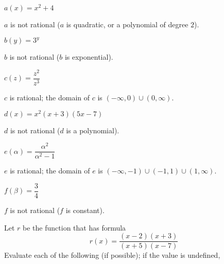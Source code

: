 \begin{exercises}
\begin{problem}
\begin{multicols}{3}
\begin{subproblem}
    \end{subproblem}
    \begin{subproblem}
    $a(x)=x^2+4$ 
        \begin{shortsolution}
        $a$ is not rational ($a$ is quadratic, or a polynomial of degree $2$).
        \end{shortsolution}
    \end{subproblem}
    \begin{subproblem}
    $b(y)=3^y$
        \begin{shortsolution}
        $b$ is not rational ($b$ is exponential).
        \end{shortsolution}
    \end{subproblem}
    \begin{subproblem}
     $c(z)=\dfrac{z^2}{z^3}$ 
        \begin{shortsolution}
        $c$ is rational; the domain of $c$ is $(-\infty,0)\cup (0,\infty)$.
        \end{shortsolution}
    \end{subproblem}
    \begin{subproblem}
    $d(x)=x^2(x+3)(5x-7)$ 
        \begin{shortsolution}
        $d$ is not rational ($d$ is a polynomial).
        \end{shortsolution}
    \end{subproblem}
    \begin{subproblem}
     $e(\alpha)=\dfrac{\alpha^2}{\alpha^2-1}$ 
        \begin{shortsolution}
        $e$ is rational; the domain of $e$ is $(-\infty,-1)\cup(-1,1)\cup(1,\infty)$.
        \end{shortsolution}
    \end{subproblem}
    \begin{subproblem}
     $f(\beta)=\dfrac{3}{4}$ 
        \begin{shortsolution}
        $f$ is not rational ($f$ is constant).
        \end{shortsolution}
    \end{subproblem}
\end{multicols}
\end{problem}
\begin{problem}
Let $r$ be the function that has formula 
\[
    r(x)=\frac{(x-2)(x+3)}{(x+5)(x-7)}
\]
Evaluate each of the following (if possible); if the value is undefined, 

\end{problem}
\end{exercises}
